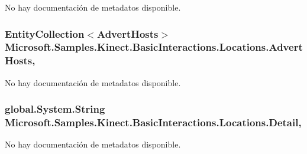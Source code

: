 No hay documentación de metadatos disponible. 

\hypertarget{class_microsoft_1_1_samples_1_1_kinect_1_1_basic_interactions_1_1_locations_a3e8798c72280a1fbaefa115062ce8467}{
\subsubsection[{Advert\-Hosts}]{\setlength{\rightskip}{0pt plus 5cm}Entity\-Collection$<${\bf Advert\-Hosts}$>$ Microsoft.\-Samples.\-Kinect.\-Basic\-Interactions.\-Locations.\-Advert\-Hosts\hspace{0.3cm}{\ttfamily [get]}, {\ttfamily [set]}}}\label{class_microsoft_1_1_samples_1_1_kinect_1_1_basic_interactions_1_1_locations_a3e8798c72280a1fbaefa115062ce8467}


No hay documentación de metadatos disponible. 

\hypertarget{class_microsoft_1_1_samples_1_1_kinect_1_1_basic_interactions_1_1_locations_ad5906857ef62c6a01feb79d52611af0b}{
\subsubsection[{Detail}]{\setlength{\rightskip}{0pt plus 5cm}global.\-System.\-String Microsoft.\-Samples.\-Kinect.\-Basic\-Interactions.\-Locations.\-Detail\hspace{0.3cm}{\ttfamily [get]}, {\ttfamily [set]}}}\label{class_microsoft_1_1_samples_1_1_kinect_1_1_basic_interactions_1_1_locations_ad5906857ef62c6a01feb79d52611af0b}


No hay documentación de metadatos disponible. 

